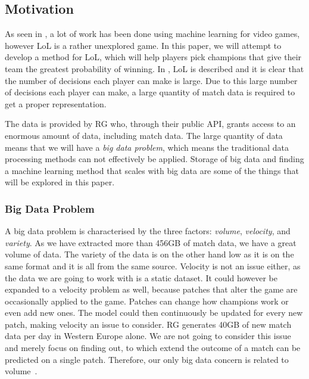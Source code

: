 \subsection{Motivation}\label{sec:motivation}
As seen in , a lot of work has been done using machine learning for video games, however LoL is a rather unexplored game. 
In this paper, we will attempt to develop a method for LoL, which will help players pick champions that give their team the greatest probability of winning. In , LoL is described and it is clear that the number of decisions each player can make is large. Due to this large number of decisions each player can make, a large quantity of match data is required to get a proper representation. 

The data is provided by RG who, through their public API, grants access to an enormous amount of data, including match data.
The large quantity of data means that we will have a \emph{big data problem}, which means the traditional data processing methods can not effectively be applied. Storage of big data and finding a machine learning method that scales with big data are some of the things that will be explored in this paper.

\subsubsection{Big Data Problem}\label{sec:big_data_problem}
A big data problem is characterised by the three factors: \emph{volume}, \emph{velocity}, and \emph{variety}. As we have extracted more than 456GB of match data, we have a great volume of data. The variety of the data is on the other hand low as it is on the same format and it is all from the same source. Velocity is not an issue either, as the data we are going to work with is a static dataset. It could however be expanded to a velocity problem as well, because patches that alter the game are occasionally applied to the game. Patches can change how champions work or even add new ones. The model could then continuously be updated for every new patch, making velocity an issue to consider. RG generates 40GB of new match data per day in Western Europe alone. We are not going to consider this issue and merely focus on finding out, to which extend the outcome of a match can be predicted on a single patch. Therefore, our only big data concern is related to volume~\cite{madden2012databases}.

